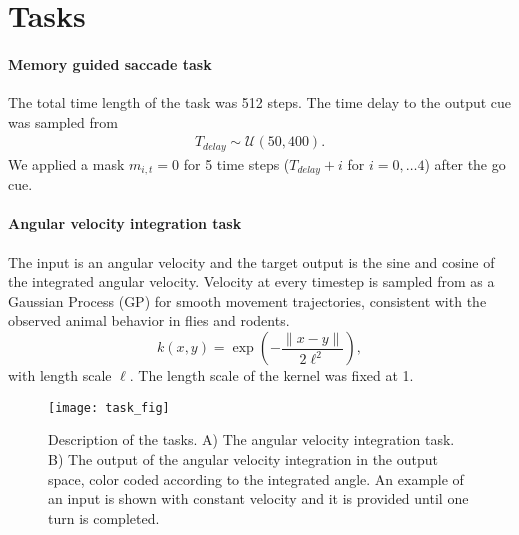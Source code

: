 \documentclass{article} %
\newcounter{ct}
\theoremstyle{definition}
\theoremstyle{remark}
\begin{document}
\newpage
\section{Tasks}\label{sec:supp:tasks}


\paragraph{Memory guided saccade task}

The total time length of the task was 512 steps.
The time delay to the output cue was sampled from 
\begin{align}
T_{delay} \sim \mathcal{U}(50, 400).
\end{align}
We applied a mask $m_{i,t}=0$ for 5 time steps ($T_{delay}+i$ for $i=0,\dots 4$) after the go cue.



\paragraph{Angular velocity integration task}
The input is an angular velocity and the target output is the sine and cosine of the integrated angular velocity.
Velocity at every timestep  is sampled from as a Gaussian Process (GP) for smooth movement trajectories, consistent with the observed animal behavior in flies and rodents.
\begin{equation}
k(x,y)=\exp\left(-\frac{\|x-y\|}{2\ell^2}\right),
\end{equation}
with length scale $\ell$.
 The length scale of the kernel was fixed at 1.
 
 \begin{figure}[tbhp]
     \centering
    \texttt{[image: task\_fig]}
       \caption{Description of the tasks. A) The angular velocity integration task. B) The output of the angular velocity integration in the output space, color coded according to the integrated angle. An example of an input is shown with constant velocity and it is provided until one turn is completed.}
         \label{fig:angular_task}
\end{figure}

 
 
 
 
\end{document}
